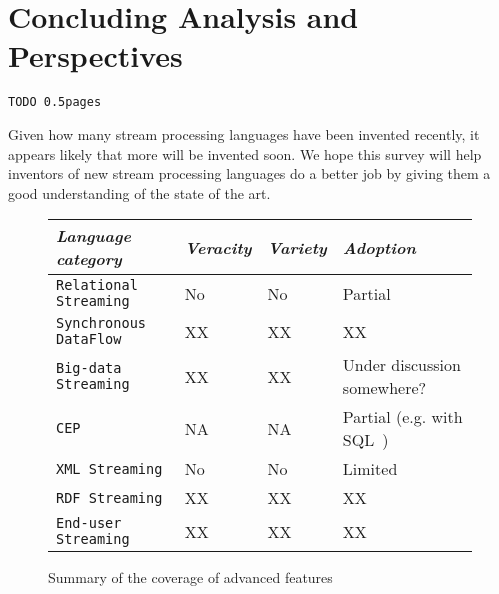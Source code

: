 \section{Concluding Analysis and Perspectives}\label{sec:conclusion}

\begin{alltt}TODO\scriptsize ~0.5 pages
\end{alltt}


Given how many stream processing languages have been invented recently, it appears likely that more will be invented soon. We hope this survey will help inventors of new stream processing languages do a better job by giving them a good understanding of the state of the art.

\begin{figure*}\centering%

\begin{tabular}{| l | l | l | l |}\hline
{\em Language category}
& {\em Veracity} & {\em Variety} & {\em Adoption} \\\hline\hline

{\tt Relational Streaming} & No & No & Partial \\\hline
{\tt Synchronous DataFlow}  & XX & XX & XX \\\hline
{\tt Big-data Streaming}  & XX & XX & Under discussion somewhere? \\\hline
{\tt CEP} & NA & NA & Partial (e.g. with SQL~\cite{zemke_et_al_2007}) \\\hline
{\tt XML Streaming} & No & No & Limited\\\hline
{\tt RDF Streaming} & XX & XX & XX \\\hline
{\tt End-user Streaming} & XX & XX & XX\\\hline
\end{tabular}
\vspace*{-0.2cm}
\caption{Summary of the coverage of advanced features}
\vspace*{-0.3cm}
\end{figure*} 